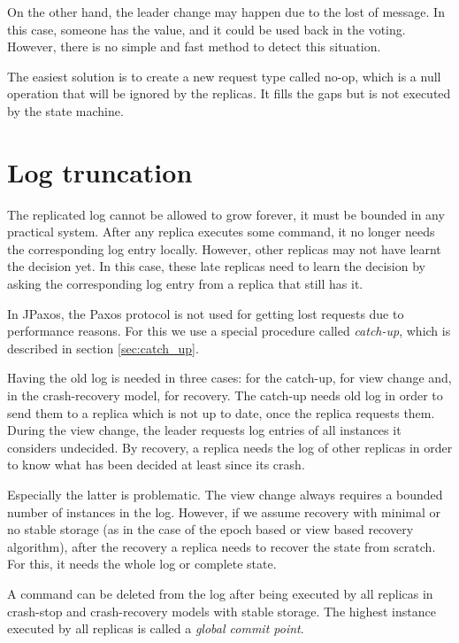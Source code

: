 On the other hand, the leader change may happen due to the lost of \alive message. In this case, someone has the value, and it could be used back in the voting. However, there is no simple and fast method to detect this situation.

The easiest solution is to create a new request type called no-op, which is a null operation that will be ignored by the replicas. It fills the gaps but is not executed by the state machine.

\section{Log truncation}

The replicated log cannot be allowed to grow forever, it must be bounded in any practical system. After any replica executes some command, it no longer needs the corresponding log entry locally. However, other replicas may not have learnt the decision yet. In this case, these late replicas need to learn the decision by asking the corresponding log entry from a replica that still has it.

In JPaxos, the Paxos protocol is not used for getting lost requests due to performance reasons. For this we use a special procedure called \textit{catch-up}, which is described in section \ref{sec:catch_up}.

Having the old log is needed in three cases: for the catch-up, for view change and, in the crash-recovery model, for recovery.
The catch-up needs old log in order to send them to a replica which is not up to date, once the replica requests them.
During the view change, the leader requests log entries of all instances it considers undecided.
By recovery, a replica needs the log of other replicas in order to know what has been decided at least since its crash.

Especially the latter is problematic. The view change always requires a bounded number of instances in the log. However, if we assume recovery with minimal or no stable storage (as in the case of the epoch based or view based recovery algorithm), after the recovery a replica needs to recover the state from scratch. For this, it needs the whole log or complete state.


A command can be deleted from the log after being executed by all replicas in crash-stop and crash-recovery models with stable storage. The highest instance executed by all replicas is called a \emph{global commit point}.

